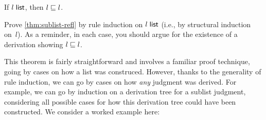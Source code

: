 \documentclass[11pt]{article}
\begin{document}
\begin{theorem}\label{thm:sublist-refl}
  If ${l}\;{\mathsf{list}}$, then ${l} \sqsubseteq {l}$.
\end{theorem}
\begin{task}{10}
  Prove \cref{thm:sublist-refl} by rule induction on ${l}\;{\mathsf{list}}$ (i.e., by structural induction on~$l$).
  As a reminder, in each case, you should argue for the existence of a derivation showing ${l} \sqsubseteq {l}$.
\end{task}

This theorem is fairly straightforward and involves a familiar proof technique, going by cases on how a list was construced.
However, thanks to the generality of rule induction, we can go by cases on how \emph{any} judgment was derived.
For example, we can go by induction on a derivation tree for a sublist judgment, considering all possible cases for how this derivation tree could have been constructed.
We consider a worked example here:
\end{document}
